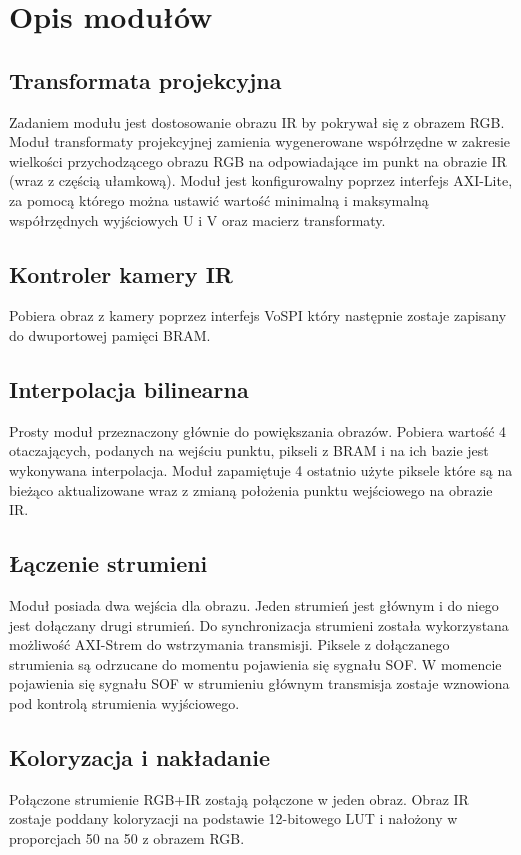 \section{Opis modułów}

\subsection{Transformata projekcyjna}
Zadaniem modułu jest dostosowanie obrazu IR by pokrywał się z obrazem RGB. Moduł transformaty projekcyjnej zamienia wygenerowane współrzędne w zakresie wielkości przychodzącego obrazu RGB na odpowiadające im punkt na obrazie IR (wraz z częścią ułamkową). Moduł jest konfigurowalny poprzez interfejs AXI-Lite, za pomocą którego można ustawić wartość minimalną i maksymalną współrzędnych wyjściowych U i V oraz macierz transformaty.
\subsection{Kontroler kamery IR}
Pobiera obraz z kamery poprzez interfejs VoSPI który następnie zostaje zapisany do dwuportowej pamięci BRAM.
\subsection{Interpolacja bilinearna}
Prosty moduł przeznaczony głównie do powiększania obrazów. Pobiera wartość 4 otaczających, podanych na wejściu punktu, pikseli z BRAM i na ich bazie jest wykonywana interpolacja. Moduł zapamiętuje 4 ostatnio użyte piksele które są na bieżąco aktualizowane wraz z zmianą położenia punktu wejściowego na obrazie IR.
\subsection{Łączenie strumieni}
Moduł posiada dwa wejścia dla obrazu. Jeden strumień jest głównym i do niego jest dołączany drugi strumień. Do synchronizacja strumieni została wykorzystana możliwość AXI-Strem do wstrzymania transmisji. Piksele z dołączanego strumienia są odrzucane do momentu pojawienia się sygnału SOF. W momencie pojawienia się sygnału SOF w strumieniu głównym transmisja zostaje wznowiona pod kontrolą strumienia wyjściowego. 
\subsection{Koloryzacja i nakładanie}
Połączone strumienie RGB+IR zostają połączone w jeden obraz. Obraz IR zostaje poddany koloryzacji na podstawie 12-bitowego LUT i nałożony w proporcjach 50 na 50 z obrazem RGB.
